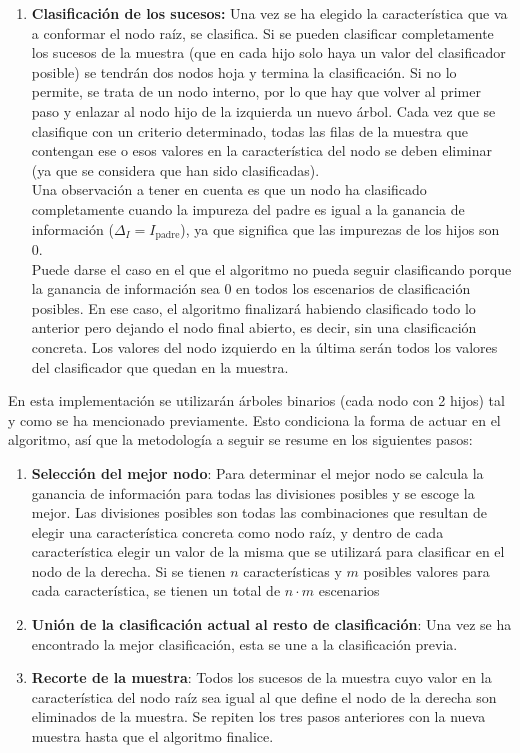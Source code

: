\documentclass[12pt]{report}\usepackage[]{graphicx}\usepackage[dvipsnames]{xcolor}
\begin{document}
\begin{enumerate}[label = \textbf{\arabic*.}]
	 				\item \textbf{Clasificación de los sucesos:} Una vez se ha elegido la característica que va a conformar el nodo raíz, se clasifica. Si se pueden clasificar completamente los sucesos de la muestra (que en cada hijo solo haya un valor del clasificador posible) se tendrán dos nodos hoja y termina la clasificación. Si no lo permite, se trata de un nodo interno, por lo que hay que volver al primer paso y enlazar al nodo hijo de la izquierda un nuevo árbol. Cada vez que se clasifique con un criterio determinado, todas las filas de la muestra que contengan ese o esos valores en la característica del nodo se deben eliminar (ya que se considera que han sido clasificadas). \\
	 				
	 				Una observación a tener en cuenta es que un nodo ha clasificado completamente cuando la impureza del padre es igual a la ganancia de información ($\Delta_I = I_{\text{padre}}$), ya que significa que las impurezas de los hijos son 0. \\
	 				
	 				Puede darse el caso en el que el algoritmo no pueda seguir clasificando porque la ganancia de información sea 0 en todos los escenarios de clasificación posibles. En ese caso, el algoritmo finalizará habiendo clasificado todo lo anterior pero dejando el nodo final abierto, es decir, sin una clasificación concreta. Los valores del nodo izquierdo en la última serán todos los valores del clasificador que quedan en la muestra.
	 			\end{enumerate}
	 			
	 			En esta implementación se utilizarán árboles binarios (cada nodo con 2 hijos) tal y como se ha mencionado previamente. Esto condiciona la forma de actuar en el algoritmo, así que la metodología a seguir se resume en los siguientes pasos:
	 			
	 			\begin{enumerate}[label = \textbf{\arabic*.}]
	 				\item \textbf{Selección del mejor nodo}: Para determinar el mejor nodo se calcula la ganancia de información para todas las divisiones posibles y se escoge la mejor. Las divisiones posibles son todas las combinaciones que resultan de elegir una característica concreta como nodo raíz, y dentro de cada característica elegir un valor de la misma que se utilizará para clasificar en el nodo de la derecha. Si se tienen $n$ características y $m$ posibles valores para cada característica, se tienen un total de $n \cdot m$ escenarios
	 				\item \textbf{Unión de la clasificación actual al resto de clasificación}: Una vez se ha encontrado la mejor clasificación, esta se une a la clasificación previa.
	 				\item \textbf{Recorte de la muestra}: Todos los sucesos de la muestra cuyo valor en la característica del nodo raíz sea igual al que define el nodo de la derecha son eliminados de la muestra. Se repiten los tres pasos anteriores con la nueva muestra hasta que el algoritmo finalice.
	 			\end{enumerate}
	 			
\end{document}
